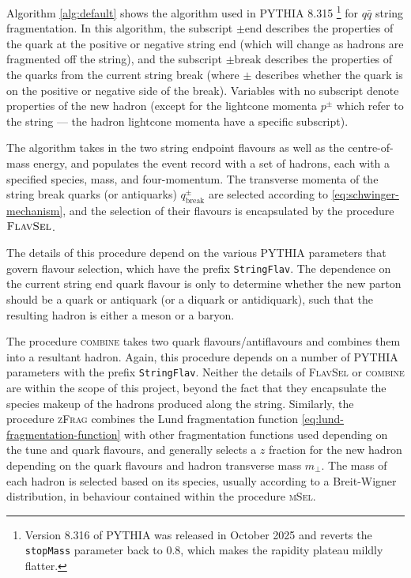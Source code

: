 \documentclass[12pt,a4paper]{report}
\begin{document}
Algorithm \ref{alg:default} shows the algorithm used in PYTHIA 8.315 \footnote{Version 8.316 of PYTHIA was released in October 2025 and reverts the \texttt{stopMass} parameter back to 0.8, which makes the rapidity plateau mildly flatter.} for $q\bar{q}$ string fragmentation.  In this algorithm, the subscript $\pm\text{end}$ describes the properties of the quark at the positive or negative string end (which will change as hadrons are fragmented off the string), and the subscript $\pm\text{break}$ describes the properties of the quarks from the current string break (where $\pm$ describes whether the quark is on the positive or negative side of the break). Variables with no subscript denote properties of the new hadron (except for the lightcone momenta $p^\pm$ which refer to the string --- the hadron lightcone momenta have a specific subscript).

The algorithm takes in the two string endpoint flavours as well as the centre-of-mass energy, and populates the event record with a set of hadrons, each with a specified species, mass, and four-momentum. The transverse momenta of the string break quarks (or antiquarks) $q_\text{break}^\pm$ are selected according to \eqref{eq:schwinger-mechanism}, and the selection of their flavours is encapsulated by the procedure $\textsc{FlavSel}$.

The details of this procedure depend on the various PYTHIA parameters that govern flavour selection, which have the prefix \texttt{StringFlav}. The dependence on the current string end quark flavour is only to determine whether the new parton should be a quark or antiquark (or a diquark or antidiquark), such that the resulting hadron is either a meson or a baryon.

The procedure \textsc{combine} takes two quark flavours/antiflavours and combines them into a resultant hadron. Again, this procedure depends on a number of PYTHIA parameters with the prefix \texttt{StringFlav}. Neither the details of \textsc{FlavSel} or \textsc{combine} are within the scope of this project, beyond the fact that they encapsulate the species makeup of the hadrons produced along the string. Similarly, the procedure \textsc{zFrag} combines the Lund fragmentation function \eqref{eq:lund-fragmentation-function} with other fragmentation functions used depending on the tune and quark flavours, and generally selects a $z$ fraction for the new hadron depending on the quark flavours and hadron transverse mass $m_\perp$. The mass of each hadron is selected based on its species, usually according to a Breit-Wigner distribution, in behaviour contained within the procedure \textsc{mSel}.
\end{document}
